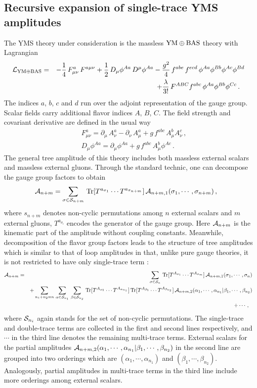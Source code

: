 \documentclass[preprint,showpacs,onecolumn,nofootinbib]{revtex4}
\newcommand{\bea}{\begin{eqnarray}}
\newcommand{\eea}{\end{eqnarray}}
\newcommand{\nn}{\nonumber \\}
\def\a{{\alpha}}
\def\b{{\beta}}
\begin{document}
\subsection{Recursive expansion of single-trace YMS amplitudes}
\label{subsec-expan-YMS}

The YMS theory under consideration is the massless ${\rm YM}\oplus {\rm BAS}$ theory with Lagrangian \cite{Chiodaroli:2017ngp}
%
\bea
{\cal L}_{{\rm YM}\oplus {\rm BAS}}&=&-{1\over4}\,F^{a}_{\mu\nu}\,F^{a\mu\nu}+{1\over2}\,D_\mu\phi^{Aa}\,D^{\mu}\phi^{Aa}
-{g^2\over4}\,f^{abe}\,f^{ecd}\,\phi^{Aa}\phi^{Bb}\phi^{Ac}\phi^{Bd}\nn
& &+{\lambda \over3!}\,F^{ABC}f^{abc}\,
\phi^{Aa}\phi^{Bb}\phi^{Cc}\,.~~\label{lag}
\eea
%
The indices $a$, $b$, $c$ and $d$ run over the adjoint representation of the gauge group. Scalar fields carry additional flavor indices $A$, $B$, $C$. The field strength and covariant derivative are defined in the usual way
%
\bea
& &F^{a}_{\mu\nu}=\partial_\mu\,A^a_\nu-\partial_\nu\,A^a_\mu+g\,f^{abc}\,A^b_\mu A^c_\nu\,,\nn
& &D_\mu\phi^{Aa}=\partial_\mu\phi^{Aa}+g\,f^{abc}\,A^b_\mu\phi^{Ac}\,.
\eea
%
The general tree amplitude of this theory includes both massless external scalars and massless external gluons.
Through the standard technic, one can decompose the gauge group factors to obtain
%
\bea
{\cal A}_{n+m}=\sum_{\sigma\in{\cal S}_{n+m}}\,{\rm Tr}[T^{a_{\sigma_1}}\cdots T^{a_{\sigma_{n+m}}}]\,{\cal A}_{n+m,1}(\sigma_1,\cdots,\sigma_{n+m})\,,~~\label{deco-color}
\eea
%
where ${s}_{n+m}$ denotes non-cyclic permutations among $n$ external scalars and $m$ external gluons, $T^{a_{\sigma_i}}$ encodes the generator of the gauge group. Here ${\cal A}_{n+m}$ is the kinematic part of the amplitude without coupling constants. Meanwhile, decomposition of the flavor group factors leads to the structure of tree amplitudes which is similar to that of loop amplitudes in that, unlike pure gauge theories, it is not restricted to have only single-trace term \cite{Chiodaroli:2014xia,Chiodaroli:2017ngp}:
%
\bea
{\cal A}_{n+m}&=&\sum_{\sigma\in{\cal S}_n}\,{\rm Tr}[T^{A_{\sigma_1}}\cdots T^{A_{\sigma_m}}]\,{\cal A}_{n+m,1}(\sigma_1,\cdots,\sigma_n)\nn
& &+\sum_{n_1+n_2=n}\,\sum_{\a\in{\cal S}_{n_1}}\,\sum_{\b\in{\cal S}_{n_2}}\,{\rm Tr}[T^{A_{\a_1}}\cdots T^{A_{\a_{n_1}}}]\,{\rm Tr}[T^{A_{\b_1}}\cdots T^{A_{\b_{n_2}}}]\,{\cal A}_{n+m,2}(\a_1,\cdots,\a_{n_1}|\b_1,\cdots,\b_{n_2})\nn
& &+\cdots\,,~~\label{multi-trace}
\eea
%
where ${\cal S}_{n_i}$ again stands for the set of non-cyclic permutations. The single-trace and double-trace terms are collected in the first and second lines respectively, and $\cdots$ in the third line denotes the remaining multi-trace terms. External scalars for the partial amplitudes ${\cal A}_{n+m,2}(\a_1,\cdots,\a_{n_1}|\b_1,\cdots,\b_{n_2})$ in the second line are grouped into two orderings which are $(\a_1,\cdots,\a_{n_1})$
and $(\b_1,\cdots,\b_{n_2})$. Analogously, partial amplitudes in multi-trace terms in the third line include more orderings among external scalars.
\end{document}
